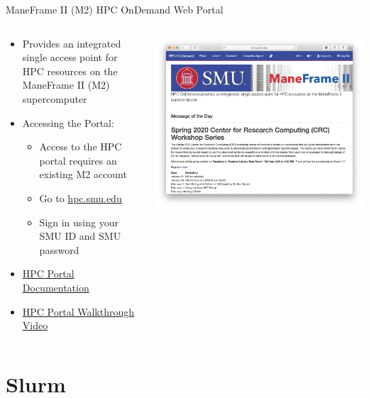\documentclass[aspectratio=169]{beamer}
\begin{document}
\begin{frame}{ManeFrame II (M2) HPC OnDemand Web Portal}
\begin{columns}[c]
\begin{column}{0.5\textwidth}
\begin{itemize}
\item Provides an integrated single access point for HPC resources on the
ManeFrame II (M2) supercomputer
\item Accessing the Portal:
\begin{itemize}
\item Access to the HPC portal requires an existing M2 account
\item Go to \url{hpc.smu.edu}
\item Sign in using your SMU ID and SMU password
\end{itemize}
\item \href{https://s2.smu.edu/hpc/documentation/portal.html}{HPC Portal
Documentation}
\item
\href{https://s2.smu.edu/hpc/documentation/portal.html\#remote-desktop}{HPC
Portal Walkthrough Video}
\end{itemize}
\end{column}
\begin{column}{0.5\textwidth}
\includegraphics[width=\linewidth]{figures/portal.png}
\end{column}
\end{columns}
\end{frame}

\section{Slurm}
\end{document}
